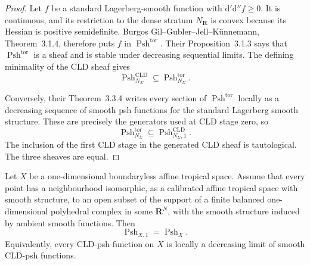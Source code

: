 \begin{proof}
Let $f$ be a standard Lagerberg-smooth function with
$\mathrm d'\mathrm d''f\geq0$.  It is continuous, and its restriction to
the dense stratum $N_{\mathbf R}$ is convex because its Hessian is positive
semidefinite.  Burgos Gil--Gubler--Jell--K\"unnemann, Theorem~3.1.4,
therefore puts $f$ in $\operatorname{Psh}^{\mathrm{tor}}$.  Their
Proposition~3.1.3 says that $\operatorname{Psh}^{\mathrm{tor}}$ is a sheaf
and is stable under decreasing sequential limits.  The defining minimality
of the CLD sheaf gives
\[
 \operatorname{Psh}^{\mathrm{CLD}}_{N_\Sigma}
 \subseteq \operatorname{Psh}^{\mathrm{tor}}_{N_\Sigma}.
\]

Conversely, their Theorem~3.3.4 writes every section of
$\operatorname{Psh}^{\mathrm{tor}}$ locally as a decreasing sequence of
smooth psh functions for the standard Lagerberg smooth structure.  These
are precisely the generators used at CLD stage zero, so
\[
 \operatorname{Psh}^{\mathrm{tor}}_{N_\Sigma}
 \subseteq \operatorname{Psh}^{\mathrm{CLD}}_{N_\Sigma,1}.
\]
The inclusion of the first CLD stage in the generated CLD sheaf is
tautological.  The three sheaves are equal.
\end{proof}

\begin{theorem}
\label{thm:p07-finite-tropical-curve-collapse-candidate}
Let $X$ be a one-dimensional boundaryless affine tropical space.  Assume
that every point has a neighbourhood isomorphic, as a calibrated affine
tropical space with smooth structure, to an open subset of the support of a
finite balanced one-dimensional polyhedral complex in some $\mathbf R^N$,
with the smooth structure induced by ambient smooth functions.  Then
\[
                    \operatorname{Psh}_{X,1}
                    =\operatorname{Psh}_X.
\]
Equivalently, every CLD-psh function on $X$ is locally a decreasing limit of
smooth CLD-psh functions.
\end{theorem}

